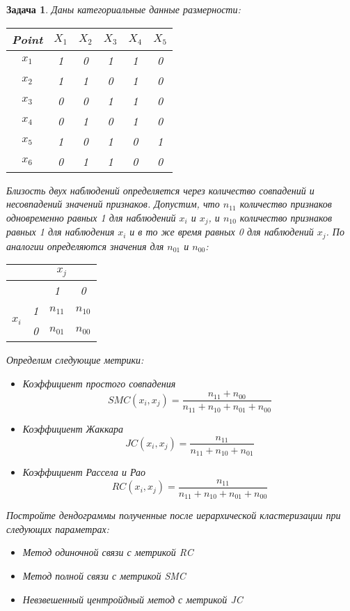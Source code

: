 \documentclass[12pt,a4paper]{article}
\newtheorem{task}[theorem]{Задача}
\begin{document}
\begin{task}
  Даны категориальные данные размерности:

  \begin{center}
    \begin{tabular}{|c|c c c c c|}
      \hline
      Point & $X_1$ & $X_2$ & $X_3$ & $X_4$ & $X_5$ \\
      \hline
      $x_1$ & 1 & 0 & 1 & 1 & 0 \\
      $x_2$ & 1 & 1 & 0 & 1 & 0 \\
      $x_3$ & 0 & 0 & 1 & 1 & 0 \\
      $x_4$ & 0 & 1 & 0 & 1 & 0 \\
      $x_5$ & 1 & 0 & 1 & 0 & 1 \\
      $x_6$ & 0 & 1 & 1 & 0 & 0 \\
      \hline
    \end{tabular}
  \end{center}

  Близость двух наблюдений определяется через количество совпадений и
  несовпадений значений признаков. Допустим, что $n_{11}$ количество признаков
  одновременно равных 1 для наблюдений $x_i$ и $x_j$, и $n_{10}$ количество
  признаков равных 1 для наблюдения $x_i$ и в то же время равных 0 для
  наблюдений $x_j$. По аналогии определяются значения для $n_{01}$ и $n_{00}$:

  \begin{center}
    \begin{tabular}{|c|c|c|c|}
      \hline
            & \multicolumn{3}{c|}{\(x_j\)} \\
      \hline
            &   & 1 & 0 \\
      \cline{2-4}
        \multirow{2}{*}{\(x_i\)} & 1 & $n_{11}$ & $n_{10}$ \\
                                 & 0 & $n_{01}$ & $n_{00}$ \\
      \hline
    \end{tabular}
  \end{center}

  Определим следующие метрики:
  \begin{itemize}
    \item Коэффициент простого совпадения
          $$SMC(x_i, x_j) = \frac{n_{11}+n_{00}}{n_{11}+n_{10}+n_{01}+n_{00}}$$
    \item Коэффициент Жаккара
          $$JC(x_i, x_j) = \frac{n_{11}}{n_{11}+n_{10}+n_{01}}$$
    \item Коэффициент Рассела и Рао
          $$RC(x_i, x_j) = \frac{n_{11}}{n_{11}+n_{10}+n_{01}+n_{00}}$$
  \end{itemize}

  Постройте дендограммы полученные после иерархической кластеризации при
  следующих параметрах:
  \begin{itemize}
    \item Метод одиночной связи с метрикой RC
    \item Метод полной связи с метрикой SMC
    \item Невзвешенный центройдный метод с метрикой JC
  \end{itemize}
\end{task}
\clearpage
\end{document}

